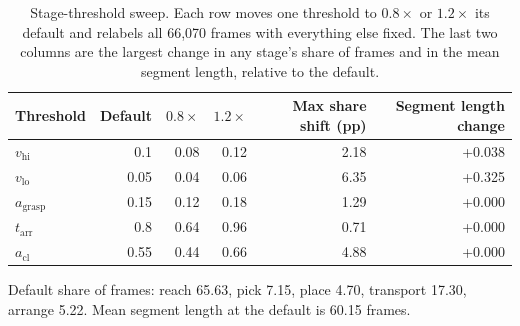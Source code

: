 \begin{table}[H]
\centering
\caption{Stage-threshold sweep. Each row moves one threshold to $0.8\times$ or $1.2\times$ its default and relabels all 66,070 frames with everything else fixed. The last two columns are the largest change in any stage's share of frames and in the mean segment length, relative to the default.}
\label{tab:p1-thr}
\footnotesize
\begin{tabular}{lrrrrr}
\toprule
Threshold & Default & $0.8\times$ & $1.2\times$ & Max share shift (pp) & Segment length change \\
\midrule
$v_{\mathrm{hi}}$ & 0.1 & 0.08 & 0.12 & 2.18 & +0.038 \\
$v_{\mathrm{lo}}$ & 0.05 & 0.04 & 0.06 & 6.35 & +0.325 \\
$a_{\mathrm{grasp}}$ & 0.15 & 0.12 & 0.18 & 1.29 & +0.000 \\
$t_{\mathrm{arr}}$ & 0.8 & 0.64 & 0.96 & 0.71 & +0.000 \\
$a_{\mathrm{cl}}$ & 0.55 & 0.44 & 0.66 & 4.88 & +0.000 \\
\bottomrule
\end{tabular}
\par\smallskip\footnotesize Default share of frames: reach 65.63, pick 7.15, place 4.70, transport 17.30, arrange 5.22. Mean segment length at the default is 60.15 frames.
\end{table}
